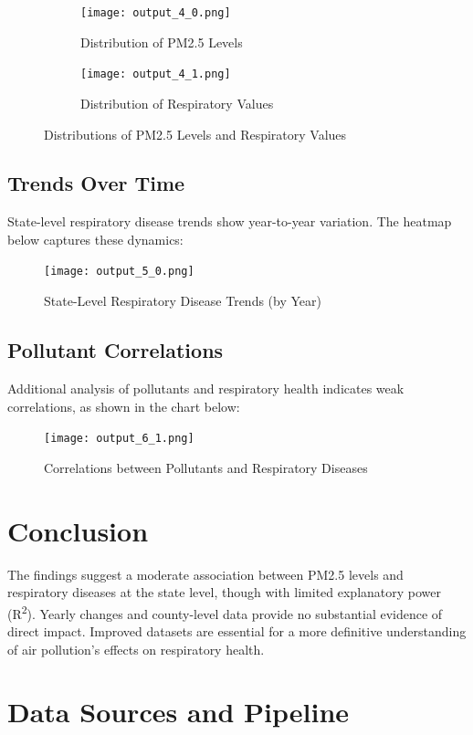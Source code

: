 \documentclass[11pt]{article}
\begin{document}
\begin{figure}[H]
    \centering
    \begin{subfigure}{0.48\textwidth}
        \centering
        \texttt{[image: output\_4\_0.png]}
        \caption{Distribution of PM2.5 Levels}
    \end{subfigure}
    \hfill
    \begin{subfigure}{0.48\textwidth}
        \centering
        \texttt{[image: output\_4\_1.png]}
        \caption{Distribution of Respiratory Values}
    \end{subfigure}
    \caption{Distributions of PM2.5 Levels and Respiratory Values}
\end{figure}

\subsection*{Trends Over Time}
State-level respiratory disease trends show year-to-year variation. The heatmap below captures these dynamics:

\begin{figure}[H]
    \centering
    \texttt{[image: output\_5\_0.png]}
    \caption{State-Level Respiratory Disease Trends (by Year)}
\end{figure}

\subsection*{Pollutant Correlations}
Additional analysis of pollutants and respiratory health indicates weak correlations, as shown in the chart below:

\begin{figure}[H]
    \centering
    \texttt{[image: output\_6\_1.png]}
    \caption{Correlations between Pollutants and Respiratory Diseases}
\end{figure}

\section*{Conclusion}
The findings suggest a moderate association between PM2.5 levels and respiratory diseases at the state level, though with limited explanatory power (R\textsuperscript{2}). Yearly changes and county-level data provide no substantial evidence of direct impact. Improved datasets are essential for a more definitive understanding of air pollution's effects on respiratory health.

\section*{Data Sources and Pipeline}
\end{document}
